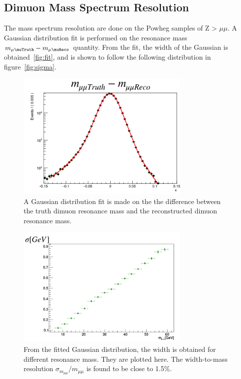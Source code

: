 
\subsection{Dimuon Mass Spectrum Resolution}
The mass spectrum resolution are done on the Powheg samples of Z > $\mu \mu
$. A Gaussian distribution fit is performed on the resonance mass $m_{\mu\muTruth} - m_{\mu\muReco}$ quantity. From the fit, the width of the Gaussian is obtained~\ref{fig:fit}, and is shown to follow the following distribution in figure~\ref{fig:sigma}.

\begin{figure}[!htb]
    \begin{center}
        \includegraphics[width=0.75\textwidth]{figures/chapter_dimuon/fitError}        
        \caption{
            A Gaussian distribution fit is made on the the difference between the truth dimuon resonance mass and the reconstructed dimuon resonance mass. }
    \end{center}
\end{figure}
   
\begin{figure}[!htb]
    \begin{center}
        \includegraphics[width=0.75\textwidth]{figures/chapter_dimuon/sigma}        
        \caption{
        From the fitted Gaussian distribution, the width is obtained for different resonance mass. They are plotted here. The width-to-mass resolution $\sigma_{m_{\mu\mu}}/m_{\mu\mu}$ is found to be close to 1.5\%.}
    \end{center}
\end{figure}


